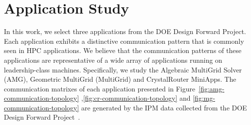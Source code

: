 
\section{Application Study}
\label{sec:application study}

In this work, we select three applications from the DOE Design Forward Project. 
Each application exhibits a distinctive communication pattern that is commonly seen in HPC applications. 
We believe that the communication patterns of these applications 
are representative of a wide array of applications running on leadership-class machines. 
Specifically, we study the Algebraic MultiGrid Solver (AMG), 
Geometric MultiGrid (MultiGrid) and CrystalRouter MiniApps. 
The communication matrixes of each application presented in Figure~\ref{fig:amg-communication-topology}
,\ref{fig:cr-communication-topology} and \ref{fig:mg-communication-topology} are generated by
the IPM data collected from the DOE Design Forward Project~\cite{designforwardwebpage}.





